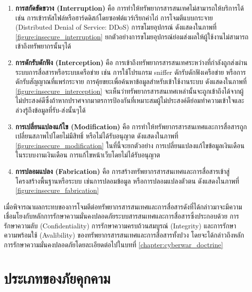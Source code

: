 \documentclass[../th_cyber_warfare_distilled.tex]{subfiles}
\begin{document}
\begin{enumerate}
	\item \textbf{การสกัดขัดขวาง (Interruption)} คือ การทำให้ทรัพยากรสารสนเทศไม่สามารถให้บริการได้ เช่น การเข้ารหัสไฟล์หรือฮาร์ดดิสก์โดยซอฟต์แวร์เรียกค่าไถ่ การโจมตีแบบกระจาย (Distributed Denial of Service: DDoS) การขโมยอุปกรณ์ ดังแสดงในภาพที่ \ref{figure:insecure_interruption} ยกตัวอย่างการขโมยอุปกรณ์ย่อมส่งผลให้ผู้ใช้งานไม่สามารถเข้าถึงทรัพยากรนั้นๆได้ 
	


	\item \textbf{การดักรับดักฟัง (Interception)} คือ การเข้าถึงทรัพยากรสารสนเทศระหว่างที่กำลังถูกส่งผ่านระบบการสื่อสารหรือระบบเครือข่าย เช่น การใช้โปรแกรม sniffer ดักรับดักฟังเครือข่าย หรือการดักรับสัญญาณที่แพร่กระจาย การคุ้ยขยะเพื่อค้นหาข้อมูลสำหรับเข้าใช้งานระบบ ดังแสดงในภาพที่ \ref{figure:insecure_interception} จะเห็นว่าทรัพยากรสารสนเทศเหล่านั้นจะถูกเข้าถึงได้จากผู้ไม่ประสงค์ดีซึ่งถ้าหากปราศจากมาตรการป้องกันที่เหมาะสมผู้ไม่ประสงค์ดีย่อมทำความเข้าใจและล่วงรู้ถึงข้อมูลที่รับ-ส่งนั้นๆได้ 

	\item \textbf{การเปลี่ยนแปลงแก้ไข (Modification)} คือ การทำให้ทรัพยากรสารสนเทศและการสื่อสารถูกเปลี่ยนสภาพไปโดยไม่มีสิทธิ์ หรือไม่ได้รับอนุญาต ดังแสดงในภาพที่ \ref{figure:insecure_modification} ในที่นี้จะยกตัวอย่าง การเปลี่ยนแปลงแก้ไขข้อมูลเงินเดือนในระบบงานเงินเดือน การแก้ไขหน้าเว็บโดยไม่ได้รับอนุญาต  



	\item \textbf{การปลอมแปลง (Fabrication)} คือ การสร้างทรัพยากรสารสนเทศและการสื่อสารเข้าสู่โครงสร้างพื้นฐานหรือระบบ เช่นการปลอมข้อมูล หรือการปลอมแปลงตัวตน ดังแสดงในภาพที่ \ref{figure:insecure_fabrication}

\end{enumerate}

เมื่อพิจารณาผลกระทบของการโจมตีต่อทรัพยากรสารสนเทศและการสื่อสารดังที่ได้กล่าวมาจะมีความเชื่อมโยงกับหลักการรักษาความมั่นคงปลอดภัยระบบสารสนเทศและการสื่อสารซึ่งประกอบด้วย การรักษาความลับ (Confidentiality) การรักษาความครบถ้วนสมบูรณ์ (Integrity) และการรักษาความพร้อมใช้ (Avalibility) ของทรัพยากรสารสนเทศและการสื่อสารทั้งปวง โดยจะได้กล่าวถึงหลักการรักษาความมั่นคงปลอดภัยโดยละเอียดต่อไปในบทที่ \ref{chapter:cyberwar_doctrine}


\section{ประเภทของภัยคุกคาม}
\end{document}
